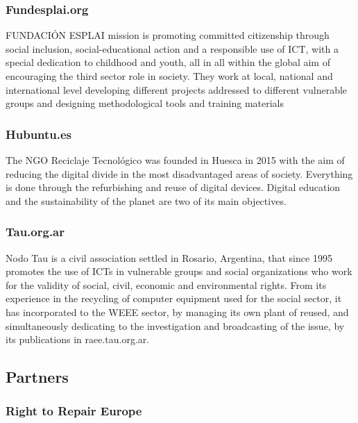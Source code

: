 \documentclass[
]{book}
\begin{document}
\hypertarget{fundesplai.org}{%
\subsubsection{Fundesplai.org}\label{fundesplai.org}}

FUNDACIÓN ESPLAI mission is promoting committed citizenship through social inclusion, social-educational action and a responsible use of ICT, with a special dedication to childhood and youth, all in all within the global aim of encouraging the third sector role in society. They work at local, national and international level developing different projects addressed to different vulnerable groups and designing methodological tools and training materials

\hypertarget{hubuntu.es}{%
\subsubsection{Hubuntu.es}\label{hubuntu.es}}

The NGO Reciclaje Tecnológico was founded in Huesca in 2015 with the aim of reducing the digital divide in the most disadvantaged areas of society. Everything is done through the refurbishing and reuse of digital devices. Digital education and the sustainability of the planet are two of its main objectives.

\hypertarget{tau.org.ar}{%
\subsubsection{Tau.org.ar}\label{tau.org.ar}}

Nodo Tau is a civil association settled in Rosario, Argentina, that since 1995 promotes the use of ICTs in vulnerable groups and social organizations who work for the validity of social, civil, economic and environmental rights. From its experience in the recycling of computer equipment used for the social sector, it has incorporated to the WEEE sector, by managing its own plant of reused, and simultaneously dedicating to the investigation and broadcasting of the issue, by its publications in raee.tau.org.ar.

\hypertarget{partners}{%
\subsection{Partners}\label{partners}}

\hypertarget{right-to-repair-europe}{%
\subsubsection{Right to Repair Europe}\label{right-to-repair-europe}}
\end{document}
